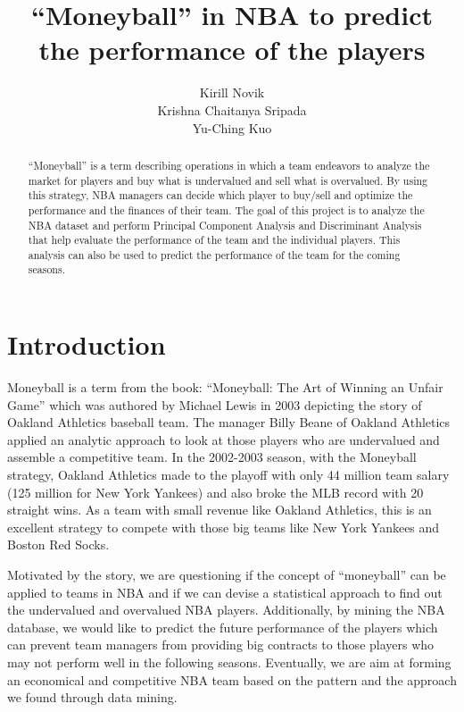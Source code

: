 \documentclass{acm_proc_article-sp}
\begin{document}
\title{``Moneyball'' in NBA to predict the performance of the players}
\author{
%
\alignauthor 
Kirill Novik\\
\alignauthor
Krishna Chaitanya Sripada\\
\alignauthor
Yu-Ching Kuo\\
}
\maketitle
\begin{abstract}
``Moneyball'' is a term describing operations in which a team endeavors to analyze the market for players and buy what is undervalued and sell what is overvalued. By using this strategy, NBA managers can decide which player to buy/sell and optimize the performance and the finances of their team. The goal of this project is to analyze the NBA dataset and perform Principal Component Analysis and Discriminant Analysis that help evaluate the performance of the team and the individual players. This analysis can also be used to predict the performance of the team for the coming seasons.
\end{abstract}


\section{Introduction}
Moneyball is a term from the book: ``Moneyball: The Art of Winning an Unfair Game'' which was authored by Michael Lewis in 2003 depicting the story of Oakland Athletics baseball team. The manager Billy Beane of Oakland Athletics applied an analytic approach to look at those players who are undervalued and assemble a competitive team. In the 2002-2003 season, with the Moneyball strategy, Oakland Athletics made to the playoff with only 44 million team salary (125 million for New York Yankees) and also broke the MLB record with 20 straight wins. As a team with small revenue like Oakland Athletics, this is an excellent strategy to compete with those big teams like New York Yankees and Boston Red Socks.

Motivated by the story, we are questioning if the concept of ``moneyball'' can be applied to teams in NBA and if we can devise a statistical approach to find out the undervalued and overvalued NBA players. Additionally, by mining the NBA database, we would like to predict the future performance of the players which can prevent team managers from providing big contracts to those players who may not perform well in the following seasons. Eventually, we are aim at forming an economical and competitive NBA team based on the pattern and the approach we found through data mining.
\end{document}
